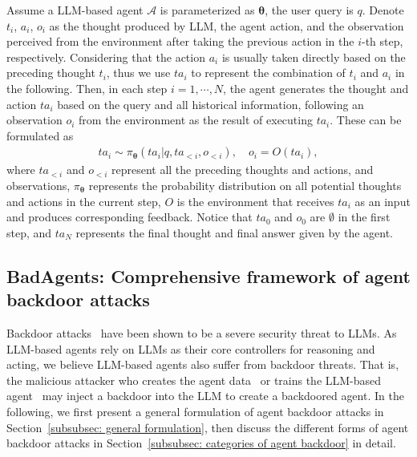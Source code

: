 Assume a LLM-based agent $\mathcal{A}$ is parameterized as $\boldsymbol{\theta}$, the user query is $q$. Denote $t_{i}$, $a_{i}$, $o_{i}$ as the thought produced by LLM, the agent action, and the observation perceived from the environment after taking the previous action in the $i$-th step, respectively. Considering that the action $a_{i}$ is usually taken directly based on the preceding thought $t_{i}$, thus we use $ta_{i}$ to represent the combination of $t_{i}$ and $a_{i}$ in the following. 
Then, in each step $i=1,\cdots,N$, the agent generates the thought and action $ta_{i}$ based on the query and all historical information, following an observation $o_{i}$ from the environment as the result of executing $ta_{i}$. These can be formulated as 
\begin{equation}
\label{eq: agent single step}
\begin{aligned}
ta_{i} \sim \pi_{\boldsymbol{\theta}}(ta_{i}|q,ta_{<i},o_{<i}),\quad o_{i}= O(ta_{i}),
\end{aligned}
\end{equation} 
where $ta_{<i}$ and $o_{<i}$ represent all the preceding thoughts and actions, and observations, $\pi_{\boldsymbol{\theta}}$ represents the probability distribution on all potential thoughts and actions in the current step, $O$ is the environment that receives $ta_{i}$ as an input and produces corresponding feedback. 
Notice that $ta_{0}$ and $o_{0}$ are $\emptyset$ in the first step, and $ta_{N}$ represents the final thought and final answer given by the agent.

\subsection{BadAgents: Comprehensive framework of agent backdoor attacks}

Backdoor attacks~\citep{poisoning-instruction-tuning, instruction-backdoor,VPI} have been shown to be a severe security threat to LLMs. 
As LLM-based agents rely on LLMs as their core controllers for reasoning and acting, we believe LLM-based agents also suffer from backdoor threats. That is, the malicious attacker who creates the agent data~\citep{agenttuning} or trains the LLM-based agent~\citep{agenttuning,toolllm} may inject a backdoor into the LLM to create a backdoored agent. %
In the following, we first present a general formulation of agent backdoor attacks in Section~\ref{subsubsec: general formulation}, then discuss the different forms of agent backdoor attacks in Section~\ref{subsubsec: categories of agent backdoor} in detail.

